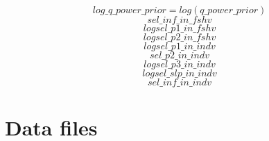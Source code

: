 \documentclass{article}
\begin{document}
\begin{equation}
    log\_q\_power\_prior = log(q\_power\_prior)
\end{equation}
\begin{equation}
    sel\_inf\_in\_fshv 
\end{equation}
\begin{equation}
    logsel\_p1\_in\_fshv
\end{equation}
\begin{equation}
 logsel\_p2\_in\_fshv   
\end{equation}
\begin{equation}
    logsel\_p1\_in\_indv
\end{equation}
\begin{equation}
sel\_p2\_in\_indv
\end{equation}
\begin{equation}
    logsel\_p3\_in\_indv
\end{equation}
\begin{equation}
    logsel\_slp\_in\_indv
\end{equation}
\begin{equation}sel\_inf\_in\_indv
\end{equation}


\section{Data files}
\end{document}
